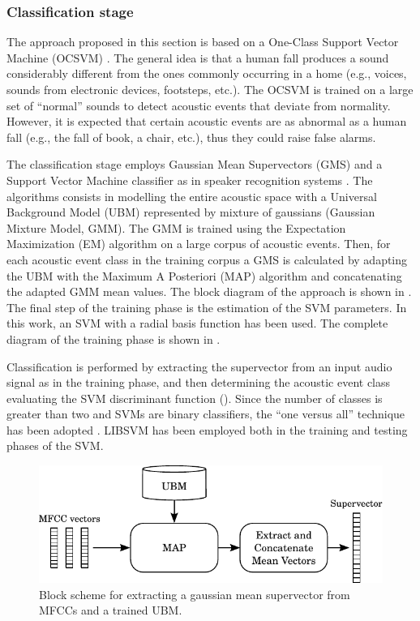 \subsubsection{Classification stage}
\label{sec:svm_multi_classification}
The approach proposed in this section is based on a One-Class Support Vector Machine (OCSVM) \cite{scholkopf2000}. The general idea is that a human fall produces a sound considerably different from the ones commonly occurring in a home (e.g., voices, sounds from electronic devices, footsteps, etc.). The OCSVM is trained on a large set of ``normal'' sounds to detect acoustic events that deviate from normality. However, it is expected that certain acoustic events are as abnormal as a human fall (e.g., the fall of book, a chair, etc.), thus they could raise false alarms. 



The classification stage employs Gaussian Mean Supervectors (GMS) and a Support Vector Machine classifier as in speaker recognition systems \cite{kinnunen10}. The algorithms consists in modelling the entire acoustic space with a Universal Background Model (UBM) represented by mixture of gaussians (Gaussian Mixture Model, GMM). The GMM is trained using the Expectation Maximization (EM) algorithm \cite{bilmes1998gentle} on a large corpus of acoustic events. Then, for each acoustic event class in the training corpus a GMS is calculated by adapting the UBM with the Maximum A Posteriori (MAP) algorithm \cite{reynolds10} and concatenating the adapted GMM mean values. The block diagram of the approach is shown in . The final step of the training phase is the estimation of the SVM parameters. In this work, an SVM with a radial basis function has been used. The complete diagram of the training phase is shown in .

Classification is performed by extracting the supervector from an input audio signal as in the training phase, and then determining the acoustic event class evaluating the SVM discriminant function (). Since the number of classes is greater than two and SVMs are binary classifiers, the ``one versus all''  technique has been adopted \cite{bishop06}. LIBSVM \cite{chang11} has been employed both in the training and testing phases of the SVM.

\begin{figure}[t]
	\centering
	\includegraphics[width=0.75\columnwidth]{img/gms_bn.pdf}
	\caption{Block scheme for extracting a gaussian mean supervector from MFCCs and a trained UBM.} \label{fig:gms}
\end{figure}


